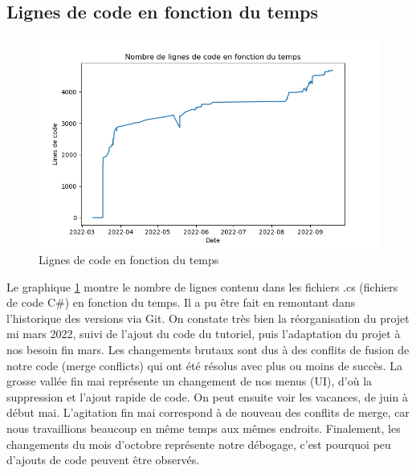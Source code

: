 \documentclass[a4paper]{article}
\begin{document}
\subsection{Lignes de code en fonction du temps}
\begin{figure}[h]
    \centering
    \includegraphics[width=\textwidth]{images/stats/lines_of_code.png}
    \caption{Lignes de code en fonction du temps}
    \label{fig:lines_of_code}
\end{figure}
Le graphique \ref{fig:lines_of_code} montre le nombre de lignes contenu dans les fichiers .cs (fichiers de code C\#) en fonction du temps. Il a pu être fait en remontant dans l’historique des versions via Git. On constate très bien la réorganisation du projet mi mars 2022, suivi de l’ajout du code du tutoriel, puis l’adaptation du projet à nos besoin fin mars. Les changements brutaux sont dus à des conflits de fusion de notre code (merge conflicts) qui ont été résolus avec plus ou moins de succès. La grosse vallée fin mai représente un changement de nos menus (UI), d'où la suppression et l’ajout rapide de code. On peut ensuite voir les vacances, de juin à début mai. L’agitation fin mai correspond à de nouveau des conflits de merge, car nous travaillions beaucoup en même temps aux mêmes endroits. Finalement, les changements du mois d’octobre représente notre débogage, c’est pourquoi peu d’ajouts de code peuvent être observés.

\newpage
\end{document}
